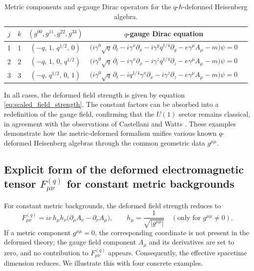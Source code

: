 \documentclass[12pt,a4paper]{article}
\theoremstyle{plain}
\theoremstyle{definition}
\begin{document}
\begin{table}[H]
\centering\small
\caption{Metric components and $q$-gauge Dirac operators for the $q$-$\hbar$-deformed Heisenberg algebra.}
\label{tab:qhbar-metrics}
\begin{tabular}{@{}cccccc@{}}
\toprule
$j$ & $k$ & $(g^{00},g^{11},g^{22},g^{33})$ & \multicolumn{2}{c}{$q$-gauge Dirac equation} \\
\midrule
1 & 1 & $(-q,\,1,\,q^{1/2},\,0)$ & \multicolumn{2}{c}{$\bigl( i\gamma^{0}\sqrt{q}\,\partial_t - i\gamma^{x}\partial_x - i\gamma^{y} q^{1/4}\partial_y - e\gamma^{\mu}A_{\mu} - m \bigr)\psi = 0$} \\
2 & 2 & $(-q,\,1,\,0,\,q^{1/2})$ & \multicolumn{2}{c}{$\bigl( i\gamma^{0}\sqrt{q}\,\partial_t - i\gamma^{x}\partial_x - i\gamma^{z} q^{1/4}\partial_z - e\gamma^{\mu}A_{\mu} - m \bigr)\psi = 0$} \\
3 & 3 & $(-q,\,q^{1/2},\,0,\,1)$ & \multicolumn{2}{c}{$\bigl( i\gamma^{0}\sqrt{q}\,\partial_t - i q^{1/4}\gamma^{x}\partial_x - i\gamma^{z}\partial_z - e\gamma^{\mu}A_{\mu} - m \bigr)\psi = 0$} \\
\bottomrule
\end{tabular}
\end{table}

In all cases, the deformed field strength is given by equation \eqref{eq:scaled_field_strength}. The constant factors can be absorbed into a redefinition of the gauge field, confirming that the $U(1)$ sector remains classical, in agreement with the observations of Castellani \cite{Castellani1992} and Watts \cite{Watts1997}. These examples demonstrate how the metric-deformed formalism unifies various known $q$-deformed Heisenberg algebras through the common geometric data $g^{\mu\mu}$.

\subsection{Explicit form of the deformed electromagnetic tensor \(F_{\mu\nu}^{(q)}\) for constant metric backgrounds}

For constant metric backgrounds, the deformed field strength reduces to
\[
F_{\mu\nu}^{(q)} = ie\, h_\mu h_\nu \bigl(\partial_\mu A_\nu - \partial_\nu A_\mu\bigr), \qquad 
h_\mu = \frac{1}{\sqrt{|g^{\mu\mu}|}} \quad (\text{only for } g^{\mu\mu}\neq 0).
\]
If a metric component \(g^{\mu\mu}=0\), the corresponding coordinate is not present in the deformed theory; the gauge field component \(A_\mu\) and its derivatives are set to zero, and no contribution to \(F_{\mu\nu}^{(q)}\) appears. Consequently, the effective spacetime dimension reduces. We illustrate this with four concrete examples.
\end{document}

